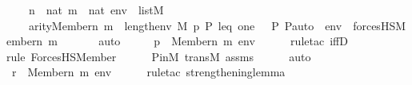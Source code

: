 \begin{isabellebody}
\ \ \ \ {\isachardoublequoteopen}n\ {\isasymin}\ nat{\isachardoublequoteclose}\ {\isachardoublequoteopen}m\ {\isasymin}\ nat{\isachardoublequoteclose}\ {\isachardoublequoteopen}env\ {\isasymin}\ list{\isacharparenleft}{\kern0pt}M{\isacharparenright}{\kern0pt}{\isachardoublequoteclose}\isanewline
\ \ \ \ {\isachardoublequoteopen}arity{\isacharparenleft}{\kern0pt}Member{\isacharparenleft}{\kern0pt}n{\isacharcomma}{\kern0pt}\ m{\isacharparenright}{\kern0pt}{\isacharparenright}{\kern0pt}\ {\isasymle}\ length{\isacharparenleft}{\kern0pt}env{\isacharparenright}{\kern0pt}{\isachardoublequoteclose}\ {\isachardoublequoteopen}M{\isacharcomma}{\kern0pt}\ {\isacharbrackleft}{\kern0pt}p{\isacharcomma}{\kern0pt}\ P{\isacharcomma}{\kern0pt}\ leq{\isacharcomma}{\kern0pt}\ one{\isacharcomma}{\kern0pt}\ {\isasymlangle}{\isasymF}{\isacharcomma}{\kern0pt}\ {\isasymG}{\isacharcomma}{\kern0pt}\ P{\isacharcomma}{\kern0pt}\ P{\isacharunderscore}{\kern0pt}auto{\isasymrangle}{\isacharbrackright}{\kern0pt}\ {\isacharat}{\kern0pt}\ env\ {\isasymTurnstile}\ forcesHS{\isacharparenleft}{\kern0pt}Member{\isacharparenleft}{\kern0pt}n{\isacharcomma}{\kern0pt}\ m{\isacharparenright}{\kern0pt}{\isacharparenright}{\kern0pt}{\isachardoublequoteclose}\ \isanewline
\ \ \ \ \isamarkupfalse%
\ auto\isanewline
\ \ \isamarkupfalse%
\ \isamarkupfalse%
\ {\isachardoublequoteopen}p\ {\isasymtturnstile}\ {\isacharparenleft}{\kern0pt}Member{\isacharparenleft}{\kern0pt}n{\isacharcomma}{\kern0pt}\ m{\isacharparenright}{\kern0pt}{\isacharparenright}{\kern0pt}\ env{\isachardoublequoteclose}\ \isanewline
\ \ \ \ \isamarkupfalse%
{\isacharparenleft}{\kern0pt}rule{\isacharunderscore}{\kern0pt}tac\ iffD{}{\isacharparenright}{\kern0pt}\isanewline
\ \ \ \ \ \isamarkupfalse%
{\isacharparenleft}{\kern0pt}rule\ ForcesHS{\isacharunderscore}{\kern0pt}Member{\isacharparenright}{\kern0pt}\isanewline
\ \ \ \ \isamarkupfalse%
\ P{\isacharunderscore}{\kern0pt}in{\isacharunderscore}{\kern0pt}M\ transM\ assms\isanewline
\ \ \ \ \isamarkupfalse%
\ auto\isanewline
\ \ \isamarkupfalse%
\ \isamarkupfalse%
\ {\isachardoublequoteopen}r\ {\isasymtturnstile}\ {\isacharparenleft}{\kern0pt}Member{\isacharparenleft}{\kern0pt}n{\isacharcomma}{\kern0pt}\ m{\isacharparenright}{\kern0pt}{\isacharparenright}{\kern0pt}\ env{\isachardoublequoteclose}\ \isanewline
\ \ \ \ \isamarkupfalse%
{\isacharparenleft}{\kern0pt}rule{\isacharunderscore}{\kern0pt}tac\ strengthening{\isacharunderscore}{\kern0pt}lemma{\isacharparenright}{\kern0pt}\isanewline

\end{isabellebody}
